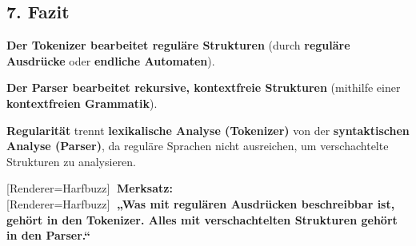 \documentclass[a4paper]{article}
\newcommand{\uliji}[1]{
  {\setmainfont{Noto Color Emoji}[Renderer=Harfbuzz]{#1}}
}
\begin{document}
\subsection*{7. Fazit}
\begin{itemize}
  \begin{item}
    \textbf{Der Tokenizer bearbeitet reguläre Strukturen} (durch \textbf{reguläre Ausdrücke} oder \textbf{endliche Automaten}).
  \end{item}
  \begin{item}
    \textbf{Der Parser bearbeitet rekursive, kontextfreie Strukturen} (mithilfe einer \textbf{kontextfreien Grammatik}).
  \end{item}
  \begin{item}
    \textbf{Regularität} trennt \textbf{lexikalische Analyse (Tokenizer)} von der \textbf{syntaktischen Analyse (Parser)}, da reguläre Sprachen nicht ausreichen, um verschachtelte Strukturen zu analysieren.
  \end{item}
\end{itemize}
\uliji{🔹} \textbf{Merksatz:}\leavevmode\\\uliji{📝} \textbf{„Was mit regulären Ausdrücken beschreibbar ist, gehört in den Tokenizer. Alles mit verschachtelten Strukturen gehört in den Parser.“}
\end{document}
